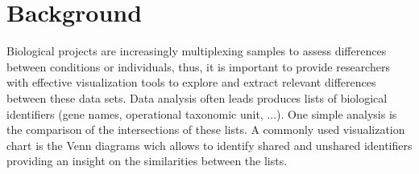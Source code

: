 \documentclass{bmcart}
\begin{document}
\begin{frontmatter}
\begin{abstractbox}
\begin{abstract}
\end{abstract}


\begin{keyword}
\end{keyword}


\end{abstractbox}
%

\end{frontmatter}




\section*{Background}

Biological projects are increasingly multiplexing samples to assess differences between conditions or individuals, 
thus, it is important to provide researchers with effective visualization tools to explore and extract 
relevant differences between these data sets. Data analysis often leads produces lists of biological  identifiers 
(gene names, operational taxonomic unit, ...). One simple analysis is the comparison of the intersections of these 
lists. A commonly used visualization chart is the Venn diagrams \cite{Venn1880} wich allows to identify 
shared and unshared identifiers providing an insight on the similarities between the lists.
\end{document}
